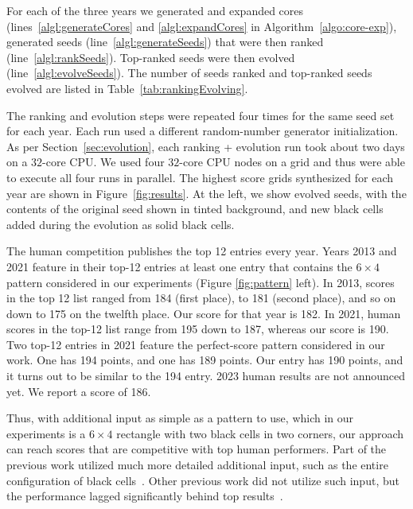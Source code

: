 For each of the three years we generated and expanded cores (lines~\ref{algl:generateCores} and \ref{algl:expandCores} in Algorithm~\ref{algo:core-exp}), generated seeds (line~\ref{algl:generateSeeds}) that were then ranked (line~\ref{algl:rankSeeds}). Top-ranked seeds were then evolved (line~\ref{algl:evolveSeeds}). The number of seeds ranked and top-ranked seeds evolved are listed in Table~\ref{tab:rankingEvolving}.


The ranking and evolution steps were repeated four times for the same seed set for each year. Each run used a different random-number generator initialization. As per Section~\ref{sec:evolution}, each ranking + evolution run took about two days on a $32$-core CPU. We used four $32$-core CPU nodes on a grid and thus were able to execute all four runs in parallel. The highest score grids synthesized for each year are shown in Figure~\ref{fig:results}. At the left, we show evolved seeds, with the contents of the original seed
shown in tinted background, and new black cells added during the evolution as solid black cells.

The human competition publishes the top 12 entries every year.
Years 2013 and 2021 feature in their top-12 entries at least one entry that contains the $6 \times 4$ pattern
considered in our experiments (Figure \ref{fig:pattern} left).
In 2013, scores in the top 12 list ranged from 184 (first place), to 181 (second place), and so on down to 175 on the twelfth place.
Our score for that year is 182.
In 2021, human scores in the top-12 list range from 195 down to 187, whereas our score is 190.
Two top-12 entries in 2021 feature the perfect-score pattern considered in our work.
One has 194 points, and one has 189 points. Our entry has 190 points, and it turns out to be similar to the 194 entry. 
2023 human results are not announced yet. We report a score of 186.

Thus, with additional input as simple as a pattern to use, which 
in our experiments
is a $6 \times 4$ rectangle with two black cells in two corners,
our approach can reach scores that are competitive with top human performers.
Part of the previous work utilized much more detailed additional input, such as the entire configuration of black cells~\cite{DBLP:conf/socs/BoteaB21}.
Other previous work did not utilize such input, but the performance lagged significantly behind
top results~\cite{DBLP:conf/cig/BulitkoB21}.




